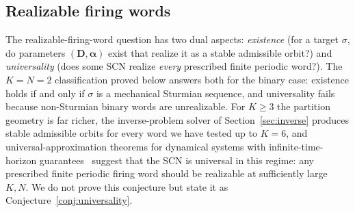 \documentclass[12pt]{article}
\newcommand{\vv}[1]{\mathbf{#1}}
\begin{document}
\subsection{Realizable firing words}

The realizable-firing-word question has two dual aspects: \emph{existence} (for a target $\sigma$, do parameters $(\vv{D},\boldsymbol{\alpha})$ exist that realize it as a stable admissible orbit?) and \emph{universality} (does some SCN realize \emph{every} prescribed finite periodic word?). The $K{=}N{=}2$ classification proved below answers both for the binary case: existence holds if and only if $\sigma$ is a mechanical Sturmian sequence, and universality fails because non-Sturmian binary words are unrealizable. For $K\geq 3$ the partition geometry is far richer, the inverse-problem solver of Section~\ref{sec:inverse} produces stable admissible orbits for every word we have tested up to $K{=}6$, and universal-approximation theorems for dynamical systems with infinite-time-horizon guarantees~\citep{Sagodi2026b} suggest that the SCN is universal in this regime: any prescribed finite periodic firing word should be realizable at sufficiently large $K,N$. We do not prove this conjecture but state it as Conjecture~\ref{conj:universality}.
\end{document}
